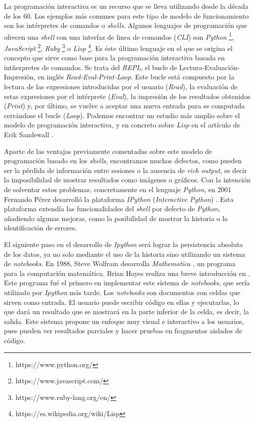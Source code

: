 \documentclass[11pt,spanish,listoffigures]{tfgetsinf}
\begin{document}
La programación interactiva es un recurso que se lleva utilizando desde la década de los 60. Los ejemplos más comunes para este tipo de modelo de funcionamiento son los intérpretes de comandos o \textit{shells}. Algunos lenguajes de programación que ofrecen una \textit{shell} con una interfaz de linea de comandos (\textit{CLI}) son \textit{Python} \footnote{https://www.python.org/}, \textit{JavaScript} \footnote{https://www.javascript.com/}, \textit{Ruby} \footnote{https://www.ruby-lang.org/en/} o \textit{Lisp} \footnote{https://es.wikipedia.org/wiki/Lisp}. Es éste último lenguaje en el que se origina el concepto que sirve como base para la programación interactiva basada en intñerpretes de comandos. Se trata del \textit{REPL}, el bucle de Lectura-Evaluación-Impresión, en inglés \textit{Read-Eval-Print-Loop}. Este bucle está compuesto por la lectura de las expresiones introducidas por el usuario (\textit{Read}), la evaluación de estas expresiones por el intérprete (\textit{Eval}), la impresión de los resultados obtenidos (\textit{Print}) y, por último, se vuelve a aceptar una nueva entrada para se computada cerrándose el bucle (\textit{Loop}). Podemos encontrar un estudio más amplio sobre el modelo de programación interactiva, y en concreto sobre \textit{Lisp} en el artículo de Erik Sandewall \cite{Sandewall}.

Aparte de las ventajas previamente comentadas sobre este modelo de programación basado en los \textit{shells}, encontramos muchos defectos, como pueden ser la pérdida de información entre sesiones o la ausencia de \textit{rich output}, es decir la imposibilidad de mostrar resultados como imágenes o gráficos. Con la intención de solventar estos problemas, concretamente en el lenguaje \textit{Python}, en 2001 Fernando Pérez desarrolló la plataforma \textit{IPython} (\textit{Interactive Python}) \cite{ipython}. Esta plataforma extendía las funcionalidades del \textit{shell} por defecto de \textit{Python}, añadiendo algunas mejoras, como la posibilidad de mostrar la historia o la identificación de errores.

El siguiente paso en el desarrollo de \textit{Ipython} será lograr la persistencia absoluta de los datos, ya no solo mediante el uso de la historia sino utilizando un sistema de \textit{notebooks}. En 1988, Steve Wolfram desarrolla \textit{Mathematica} \cite{math}, un programa para la computación matemática. Brian Hayes realiza una breve introducción en \cite{th-mathematica}. Este programa fué el primero en implementar este sistema de \textit{notebooks}, que sería utilizado por \textit{Ipython} más tarde. Los \textit{notebooks} son documentos con celdas que sirven como entrada. El usuario puede escribir código en ellas y ejecutarlas, lo que dará un resultado que se mostrará en la parte inferior de la celda, es decir, la salida. Este sistema propone un enfoque muy visual e interactivo a los usuarios, pues pueden ver resultados parciales y hacer pruebas en fragmentos aislados de código.
\end{document}
